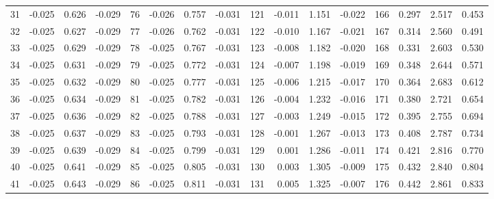 \begin{table}
{\begin{tabular}{rrrr|rrrr|rrrr|crrr}
 31 & \tiny{ -0.025} &   0.626 & \tiny{ -0.029} &  76 & \tiny{ -0.026} &   0.757 & \tiny{ -0.031} & 121 & \tiny{ -0.011} &   1.151 & \tiny{ -0.022} & 166 & \tiny{  0.297} &   2.517 & \tiny{  0.453}\\
 32 & \tiny{ -0.025} &   0.627 & \tiny{ -0.029} &  77 & \tiny{ -0.026} &   0.762 & \tiny{ -0.031} & 122 & \tiny{ -0.010} &   1.167 & \tiny{ -0.021} & 167 & \tiny{  0.314} &   2.560 & \tiny{  0.491}\\
 33 & \tiny{ -0.025} &   0.629 & \tiny{ -0.029} &  78 & \tiny{ -0.025} &   0.767 & \tiny{ -0.031} & 123 & \tiny{ -0.008} &   1.182 & \tiny{ -0.020} & 168 & \tiny{  0.331} &   2.603 & \tiny{  0.530}\\
 34 & \tiny{ -0.025} &   0.631 & \tiny{ -0.029} &  79 & \tiny{ -0.025} &   0.772 & \tiny{ -0.031} & 124 & \tiny{ -0.007} &   1.198 & \tiny{ -0.019} & 169 & \tiny{  0.348} &   2.644 & \tiny{  0.571}\\
 35 & \tiny{ -0.025} &   0.632 & \tiny{ -0.029} &  80 & \tiny{ -0.025} &   0.777 & \tiny{ -0.031} & 125 & \tiny{ -0.006} &   1.215 & \tiny{ -0.017} & 170 & \tiny{  0.364} &   2.683 & \tiny{  0.612}\\
 36 & \tiny{ -0.025} &   0.634 & \tiny{ -0.029} &  81 & \tiny{ -0.025} &   0.782 & \tiny{ -0.031} & 126 & \tiny{ -0.004} &   1.232 & \tiny{ -0.016} & 171 & \tiny{  0.380} &   2.721 & \tiny{  0.654}\\
 37 & \tiny{ -0.025} &   0.636 & \tiny{ -0.029} &  82 & \tiny{ -0.025} &   0.788 & \tiny{ -0.031} & 127 & \tiny{ -0.003} &   1.249 & \tiny{ -0.015} & 172 & \tiny{  0.395} &   2.755 & \tiny{  0.694}\\
 38 & \tiny{ -0.025} &   0.637 & \tiny{ -0.029} &  83 & \tiny{ -0.025} &   0.793 & \tiny{ -0.031} & 128 & \tiny{ -0.001} &   1.267 & \tiny{ -0.013} & 173 & \tiny{  0.408} &   2.787 & \tiny{  0.734}\\
 39 & \tiny{ -0.025} &   0.639 & \tiny{ -0.029} &  84 & \tiny{ -0.025} &   0.799 & \tiny{ -0.031} & 129 & \tiny{  0.001} &   1.286 & \tiny{ -0.011} & 174 & \tiny{  0.421} &   2.816 & \tiny{  0.770}\\
 40 & \tiny{ -0.025} &   0.641 & \tiny{ -0.029} &  85 & \tiny{ -0.025} &   0.805 & \tiny{ -0.031} & 130 & \tiny{  0.003} &   1.305 & \tiny{ -0.009} & 175 & \tiny{  0.432} &   2.840 & \tiny{  0.804}\\
 41 & \tiny{ -0.025} &   0.643 & \tiny{ -0.029} &  86 & \tiny{ -0.025} &   0.811 & \tiny{ -0.031} & 131 & \tiny{  0.005} &   1.325 & \tiny{ -0.007} & 176 & \tiny{  0.442} &   2.861 & \tiny{  0.833}\\

\end{tabular}}
\end{table}
